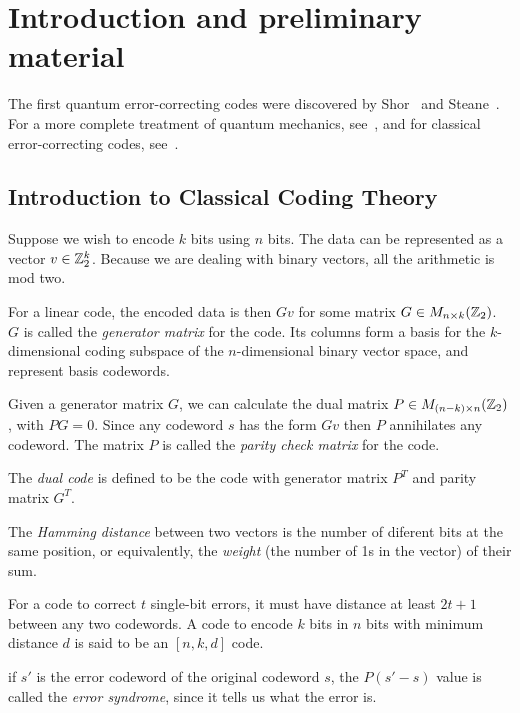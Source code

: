 \chapter{Introduction and preliminary material}
\label{ch:chap-intro}

The first quantum error-correcting codes were discovered by Shor~\cite{shor-9qubit} and Steane~\cite{steane-7qubit}.
For a more complete treatment of quantum mechanics, see~\cite{cohen-tannoudji}, and for classical error-correcting codes, see~\cite{macwilliams-sloane}.

\section{Introduction to Classical Coding Theory}
\label{sec-classical}

Suppose we wish to encode $k$ bits using $n$ bits.
The data can be represented as a vector $v\in\mathbb{Z}_2^k$.
Because we are dealing with binary vectors, all the arithmetic is mod two.

For a linear code, the encoded data is then $G v$ for some matrix $G\in M_{n \times k}(\mathbb{Z}_2)$.
$G$ is called the {\em generator matrix} for the code.
Its columns form a basis for the $k$-dimensional coding subspace of the $n$-dimensional binary vector space, and represent basis codewords.

Given a generator matrix $G$, we can calculate the dual matrix $P\in M_{(n-k) \times n}(\mathbb{Z}_2)$, with $PG=0$.
Since any codeword $s$ has the form $G v$ then $P$ annihilates any codeword.
The matrix $P$ is called the {\em parity check matrix} for the code.

The {\em dual code} is defined to be the code with generator matrix $P^T$
and parity matrix $G^T$.

The {\em Hamming distance} between two vectors is the number of diferent bits at the same position, or equivalently, the {\em weight} (the number of 1s in the vector) of their sum.

For a code to correct $t$ single-bit errors, it must have distance at least $2t+1$ between any two codewords.
A code to encode $k$ bits in $n$ bits with minimum distance $d$ is said to be an $[n, k, d]$ code.

if $s'$ is the error codeword of the original codeword $s$, the $P(s'-s)$ value is called the {\em error syndrome}, since it tells us what the error is.